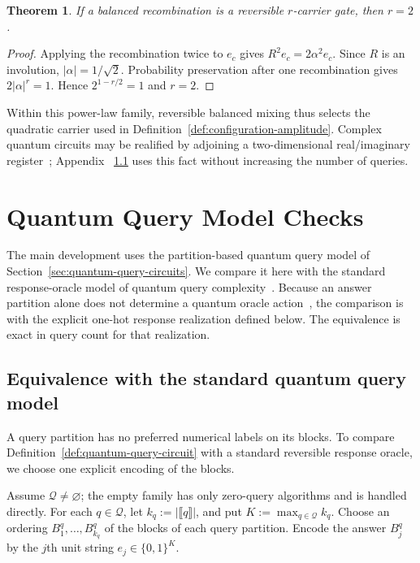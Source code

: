 \documentclass[11pt]{article}
\numberwithin{equation}{section}
\newtheorem{theorem}[definition]{Theorem}
\theoremstyle{remark}
\begin{document}
\begin{theorem}
\label{thm:square-root-forced}
If a balanced recombination is a reversible $r$-carrier gate, then $r=2$.
\end{theorem}

\begin{proof}
Applying the recombination twice to $e_c$ gives
$R^2e_c=2\alpha^2e_c$. Since $R$ is an involution,
$|\alpha|=1/\sqrt2$. Probability preservation after one recombination gives
$2|\alpha|^r=1$. Hence $2^{1-r/2}=1$ and $r=2$.
\end{proof}

Within this power-law family, reversible balanced mixing thus selects
the quadratic carrier used in Definition~\ref{def:configuration-amplitude}.
Complex quantum circuits may be realified by adjoining a two-dimensional
real/imaginary register~\cite{BernsteinVazirani1997,Aharonov2003}; Appendix
~\ref{app:quantum-model-equivalence} uses this fact without increasing the
number of queries.

\section{Quantum Query Model Checks}
\label{app:quantum-query-checks}

The main development uses the partition-based quantum query model of Section~\ref{sec:quantum-query-circuits}. We compare it here with the standard response-oracle model of quantum query complexity~\cite{BealsBuhrmanCleveMoscaDeWolf2001}. Because an answer partition alone does not determine a quantum oracle action~\cite{Svozil2026AnswerPartitions}, the comparison is with the explicit one-hot response realization defined below. The equivalence is exact in query count for that realization.

\subsection{Equivalence with the standard quantum query model}
\label{app:quantum-model-equivalence}

A query partition has no preferred numerical labels on its blocks. To compare Definition~\ref{def:quantum-query-circuit} with a standard reversible response oracle, we choose one explicit encoding of the blocks.

Assume $\mathcal Q\ne\varnothing$; the empty family has only zero-query
algorithms and is handled directly. For each $q\in\mathcal Q$, let
$k_q:=|\llbracket q\rrbracket|$, and put
$K:=\max_{q\in\mathcal Q}k_q$. Choose an ordering $B_1^q,\ldots,B_{k_q}^q$ of the blocks of each query partition. Encode the answer $B_j^q$ by the
$j$th unit string $e_j\in\{0,1\}^K$.
\end{document}
